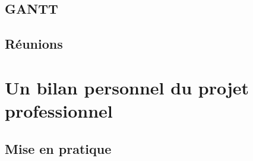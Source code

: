 \documentclass[11pt]{article}
\begin{document}
	\subsection{GANTT}
	\subsection{Réunions}

\section{Un bilan personnel du projet professionnel}

	\subsection{Mise en pratique}


\begin{appendix} \end{appendix}
\end{document}
